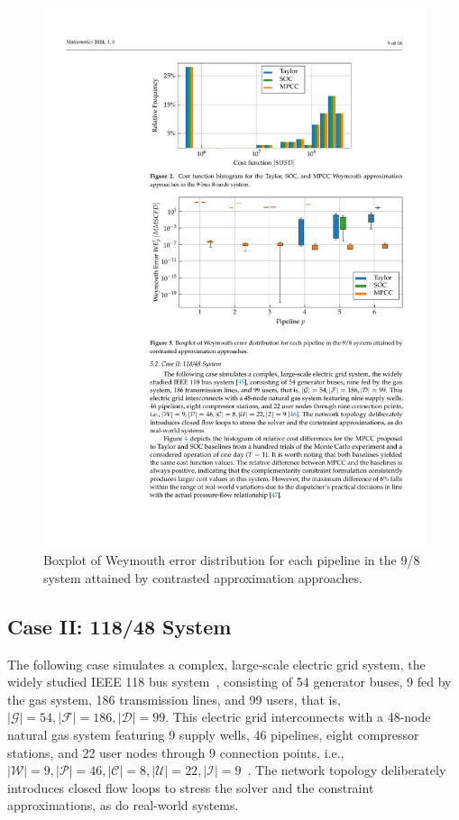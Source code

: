 \vspace{-10pt}
\begin{figure}[H]
    
     \includegraphics[scale=0.98]{figures/Chapter_MPCC/g002.pdf}
    \caption{Boxplot of Weymouth error distribution for each pipeline in the 9/8 system attained by contrasted approximation approaches.}
    \label{fig:blue_test_boxplot}
\end{figure}

\subsection{Case II: 118/48 System}

The following case simulates a complex, large-scale electric grid system, the widely studied IEEE 118 bus system~\citep{WANG201970}, consisting of 54 generator buses, 9 fed by the gas system, 186 transmission lines, and 99 users, that is, $\left| \mathcal{G} \right| = 54, \left| \mathcal{F} \right| = 186, \left| \mathcal{D} \right| = 99$. This electric grid interconnects with a 48-node natural gas system featuring 9 supply wells, 46 pipelines, eight compressor stations, and 22 user nodes through 9 connection points, i.e., $\left| \mathcal{W} \right| = 9, \left| \mathcal{P} \right| = 46, \left| \mathcal{C} \right| = 8, \left| \mathcal{U} \right| = 22, \left| \mathcal{I} \right| = 9$~\citep{Conejo}. The network topology deliberately introduces closed flow loops to stress the solver and the constraint approximations, as do real-world systems.

